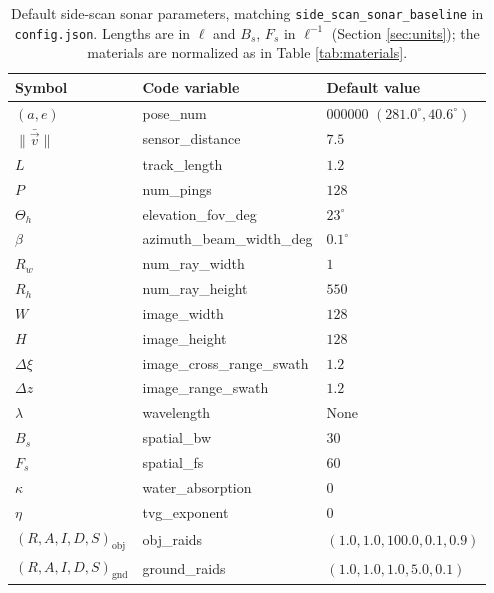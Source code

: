 \documentclass[sensors,article,submit,moreauthors]{Definitions/mdpi}
\begin{document}
\begin{table}[H]
\centering
\caption{Default side-scan sonar parameters, matching
\texttt{side\_scan\_sonar\_baseline} in \texttt{config.json}. Lengths are in
$\ell$ and $B_s$, $F_s$ in $\ell^{-1}$ (Section \ref{sec:units}); the materials
are normalized as in Table \ref{tab:materials}.}
\label{tab:sss-params}
\begin{tabular}{lll}
\toprule
\textbf{Symbol} & \textbf{Code variable} & \textbf{Default value} \\
\midrule
$(a,e)$                    & pose\_num                & 000000 $(281.0^\circ,
40.6^\circ)$ \\
$\lVert\bar{\vec{v}}\rVert$ & sensor\_distance         & $7.5$ \\
$L$                        & track\_length            & $1.2$ \\
$P$                        & num\_pings               & $128$ \\
$\Theta_h$                 & elevation\_fov\_deg      & $23^\circ$ \\
$\beta$                    & azimuth\_beam\_width\_deg & $0.1^\circ$ \\
$R_w$                      & num\_ray\_width          & $1$ \\
$R_h$                      & num\_ray\_height         & $550$ \\
$W$                        & image\_width             & $128$ \\
$H$                        & image\_height            & $128$ \\
$\Delta\xi$                & image\_cross\_range\_swath & $1.2$ \\
$\Delta z$                 & image\_range\_swath      & $1.2$ \\
$\lambda$                  & wavelength               & None \\
$B_s$                      & spatial\_bw              & $30$ \\
$F_s$                      & spatial\_fs              & $60$ \\
$\kappa$                   & water\_absorption        & $0$ \\
$\eta$                     & tvg\_exponent            & $0$ \\
$(R,A,I,D,S)_{\text{obj}}$ & obj\_raids               & $(1.0, 1.0, 100.0, 0.1,
0.9)$ \\
$(R,A,I,D,S)_{\text{gnd}}$ & ground\_raids            & $(1.0, 1.0, 1.0, 5.0,
0.1)$ \\

\end{tabular}
\end{table}
\end{document}
